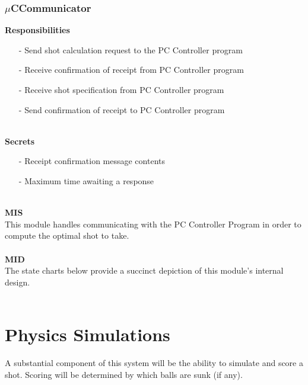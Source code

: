 \documentclass[titlepage]{article}
\begin{document}
\subsubsection{$\mu$CCommunicator}
\textbf{Responsibilities}
\begin{itemize}
	\item[-] Send shot calculation request to the PC Controller program
	\item[-] Receive confirmation of receipt from PC Controller program
	\item[-] Receive shot specification from PC Controller program
	\item[-] Send confirmation of receipt to PC Controller program 
\end{itemize}~\\
\textbf{Secrets}
\begin{itemize}
	\item[-] Receipt confirmation message contents
	\item[-] Maximum time awaiting a response
\end{itemize}~\\
\textbf{MIS}\\[2mm]
This module handles communicating with the PC Controller Program in order to compute the optimal shot to take.
\\\\
\textbf{MID}\\[2mm]
The state charts below provide a succinct depiction of this module's internal design.
\\\\



\section{Physics Simulations}
A substantial component of this system will be the ability to simulate and score a shot. Scoring will be determined by which balls are sunk (if any).
\end{document}
